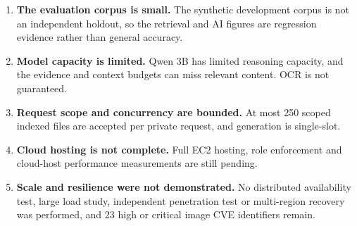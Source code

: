 \begin{enumerate}
  \item \textbf{The evaluation corpus is small.} The synthetic development corpus is not an independent holdout, so the retrieval and AI figures are regression evidence rather than general accuracy.
  \item \textbf{Model capacity is limited.} Qwen 3B has limited reasoning capacity, and the evidence and context budgets can miss relevant content. OCR is not guaranteed.
  \item \textbf{Request scope and concurrency are bounded.} At most 250 scoped indexed files are accepted per private request, and generation is single-slot.
  \item \textbf{Cloud hosting is not complete.} Full EC2 hosting, role enforcement and cloud-host performance measurements are still pending.
  \item \textbf{Scale and resilience were not demonstrated.} No distributed availability test, large load study, independent penetration test or multi-region recovery was performed, and 23 high or critical image CVE identifiers remain.
\end{enumerate}
